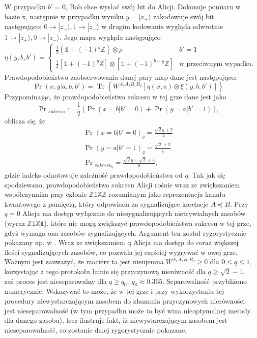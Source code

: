 \documentclass[10pt]{article} %
\DeclareMathOperator{\Trs}{Tr}
\newcommand{\Ket}[1]{|#1\rangle}
\newcommand{\WAll}{W^{A_1A_2B_1B_2}}
\newcommand{\X}{\mathbb{X}}
\newcommand{\Z}{\mathbb{Z}}
\newcommand{\I}{\mathbb{1}}
\begin{document}
W przypadku $b'=0$, Bob chce wysłać swój bit do Alicji. Dokonuje pomiaru w bazie x, następnie w przypadku wyniku $y = \Ket{x_+}$ zakodowuje swój bit następująco: $0 \to \Ket{z_+}, 1 \to \Ket{z_-}$ w drugim kodowanie wygląda odwrotnie $1 \to \Ket{z_+}, 0 \to \Ket{z_-}$. Jego mapa wygląda następująco
\begin{equation}
\eta(y, b, b') =
\begin{cases}
\frac{1}{2}\left(
\I + (-1)^y\Z
\right) \otimes \rho&b'=1\\
\frac{1}{4} \left[ \I + (-1)^y \X \right] \otimes \left[ \I + (-1)^{b+y} \Z \right]& \text{w przeciwnym wypadku}.
\end{cases}
\end{equation}
Prawdopodobieństwo zaobserwowania danej pary map dane jest następująco:
\begin{equation}
\Pr(x,y|a,b,b') = \Trs\left\{{\WAll\left[\eta(x,a) \otimes \xi(y,b,b') \right]}\right\}
\end{equation}
Przypominając, że prawdopodobieństwo sukcesu w tej grze dane jest jako
\begin{equation}
\Pr{}_{sukcesu} := \frac{1}{2} \left[ \Pr(x=b|b'=0) + \Pr(y=a|b' = 1)\right],
\end{equation}
oblicza się, że
\begin{gather}
\Pr(x=b|b'=0)_q = \frac{\sqrt{2}q+2}{4} \\
\Pr(y=a|b'=1)_q = \frac{\sqrt{2}+2}{4} \\ 
\Pr{}_{sukcesu_q} = \frac{\sqrt{2}q + \sqrt{2} + 4}{8},
\end{gather}
gdzie indeks odnotowuje zależność prawdopodobieństwa od $q$. Tak jak się spodziewano, prawdopodobieństwo sukcesu Alicji rośnie wraz ze zwiększaniem współczynnika przy członie $\Z\I\X\Z$ rozumianym jako reprezentacja kanału kwantowego z pamięcią, który odpowiada za sygnalizujące korelacje $A \preceq B$.
Przy $q = 0$ Alicja ma dostęp wyłącznie do niesygnalizujących nietrywialnych zasobów (wyraz $\Z\I\X\I$), które nie mogą zwiększyć prawdopodobieństwa sukcesu w tej grze, gdyż wymaga ona zasobów sygnalizujących. Argument ten został rygorystycznie pokazany np. w \cite{mp_gyni}. Wraz ze zwiększaniem q Alicja ma dostęp do coraz
większej ilości sygnalizujących zasobów, co pozwala jej częściej wygrywać w owej grze. Ważnym jest zauważyć, że macierz ta jest nieujemna $\WAll \geq 0$ dla $0 \leq q \leq 1$, korzystając z tego protokołu łamie się przyczynową nierówność dla $q \geq \sqrt{2} - 1$, zaś proces jest nieseparowalny dla $q \geq q_0,~q_0 \approx 0.365$.
Separowalność przybliżono numerycznie. Wskazywać to może, że w tej grze i przy wykorzystaniu tej procedury niewystarczającym zasobem do złamania przyczynowych nierówności jest nieseparowalność (w tym przypadku może to być wina nieoptymalnej metody dla danego zasobu), lecz ilustruje fakt, iż niewystarczającym zasobem jest nieseparowalność, co zostanie dalej rygorystycznie pokazane.
\end{document}
